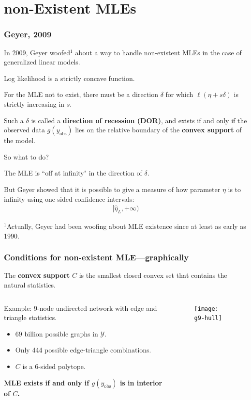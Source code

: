 \documentclass[slidestop,compress, 10pt]{beamer}
\def\YY{{\mathcal Y}}
\newcommand{\yobs}{y_{\text{obs}}}
\begin{document}
\section{non-Existent MLEs}
\frame
{
  \frametitle{Geyer, 2009}  

In 2009, Geyer woofed$^1$ about a way to handle non-existent MLEs in the case of generalized linear models.
\vspace{2mm}

Log likelihood is a strictly concave function.  

For the MLE not to exist, there must be a direction $\delta$ for which
$\ell(\eta + s\delta)$ is strictly increasing in $s$.

Such a $\delta$ is called a \textbf{direction of recession (DOR)}, 
and exists if and only if the
observed data $g(\yobs)$ lies on the relative boundary of the \textbf{convex support} of the model.
\vspace{2mm}

So what to do?

The MLE is ``off at infinity" in the direction of $\delta$.

But Geyer showed that it is possible to give a measure of how parameter $\eta$ is to infinity using one-sided confidence intervals:
\begin{align*}
	[\hat{\eta}_L, +\infty)
\end{align*}

\vspace{0.2in}
\footnotesize{$^1$Actually, Geyer had been woofing about MLE existence since at least as early as 1990.}
}

\frame
{
  \frametitle{Conditions for non-existent MLE---graphically}  
The \textbf{convex support} $C$ is the smallest closed convex set that contains the natural statistics.

\begin{columns}[T]
\begin{column}[T]{0.45\textwidth}
\vspace{4mm}

{\small
Example: 9-node undirected network with edge and triangle statistics.
\begin{itemize}
\item 69 billion possible graphs in $\YY$.
\item Only 444 possible edge-triangle combinations.
\item $C$ is a 6-sided polytope.
\end{itemize}

\textbf{MLE exists if and only if
$g(\yobs)$ is in interior of $C$.}
}
\end{column}
\begin{column}[T]{0.55\textwidth}
\begin{figure}[h]
\centering
\texttt{[image: g9-hull]}
\end{figure}
\end{column}
\end{columns}
}
\end{document}
